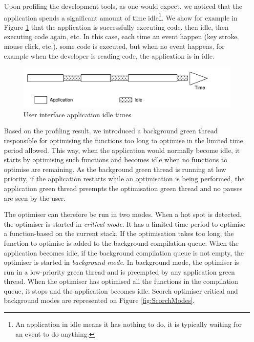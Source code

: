 \documentclass[a4paper,12pt,twoside]{../includes/ThesisStyle}
\begin{document}
Upon profiling the development tools, as one would expect, we noticed that the application spends a significant amount of time idle\footnote{An application in idle means it has nothing to do, it is typically waiting for an event to do anything.}. We show for example in Figure \ref{fig:ApplicationIdle} that the application is successfully executing code, then idle, then executing code again, etc. In this case, each time an event happen (key stroke, mouse click, etc.), some code is executed, but when no event happens, for example when the developer is reading code, the application is in idle.

\begin{figure}[h!]
    \begin{center}
        \includegraphics[width=0.95\linewidth]{ApplicationIdle}
        \caption{User interface application idle times}
        \label{fig:ApplicationIdle}
    \end{center}
\end{figure}

Based on the profiling result, we introduced a background green thread responsible for optimising the functions too long to optimise in the limited time period allowed. This way, when the application would normally become idle, it starts by optimising such functions and becomes idle when no functions to optimise are remaining. As the background green thread is running at low priority, if the application restarts while an optimisation is being performed, the application green thread preempts the optimisation green thread and no pauses are seen by the user.

The optimiser can therefore be run in two modes. When a hot spot is detected, the optimiser is started in \emph{critical mode}. It has a limited time period to optimise a function-based on the current stack. If the optimisation takes too long, the function to optimise is added to the background compilation queue. When the application becomes idle, if the background compilation queue is not empty, the optimiser is started in \emph{background mode}. In background mode, the optimiser is run in a low-priority green thread and is preempted by any application green thread. When the optimiser has optimised all the functions in the compilation queue, it stops and the application becomes idle. Scorch optimiser critical and background modes are represented on Figure \ref{fig:ScorchModes}.
\end{document}
